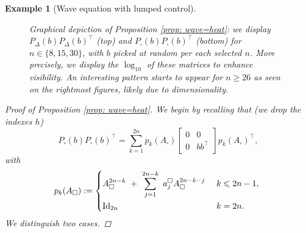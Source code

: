 \documentclass[11pt, a4paper, reqno]{amsart}
\theoremstyle{plain}
\numberwithin{equation}{section}
\newtheorem{example}{Example}[section]
\begin{document}
\begin{example}[Wave equation with lumped control]
\begin{figure}
	\caption{Graphical depiction of Proposition \ref{prop: wave=heat}: we display $P_{\Delta}(b)P_{\Delta}(b)^\top$ (top) and $P_{\square}(b)P_{\square}(b)^\top$ (bottom) for $n\in\{8, 15, 30\}$, with $b$ picked at random per each selected $n$. More precisely, we display the $\log_{10}$ of these matrices to enhance visibility. An interesting pattern starts to appear for $n\geqslant26$ as seen on the rightmost figures, likely due to dimensionality.}
	\end{figure}
	
	\begin{proof}[Proof of Proposition \ref{prop: wave=heat}]
	We begin by recalling that (we drop the indexes $h$)
	\begin{equation*}
	P_\square(b)P_\square(b)^\top = \sum_{k=1}^{2n} p_k(A_{\square}) \begin{bmatrix} 0 & 0\\
	0 & bb^\top\end{bmatrix} p_k(A_{\square})^\top,
	\end{equation*}
	with 
	\begin{equation*}
	p_k(A_{\square}) := \begin{dcases} A_\square^{2n-k} + \sum_{j=1}^{2n-k} a^\square_j A_\square^{2n-k-j}  &k\leqslant 2n-1, \\
	\mathrm{Id}_{2n} &k=2n.
	\end{dcases}
	\end{equation*}
	We distinguish two cases.
	\smallskip
	

\end{proof}
\end{example}
\end{document}
